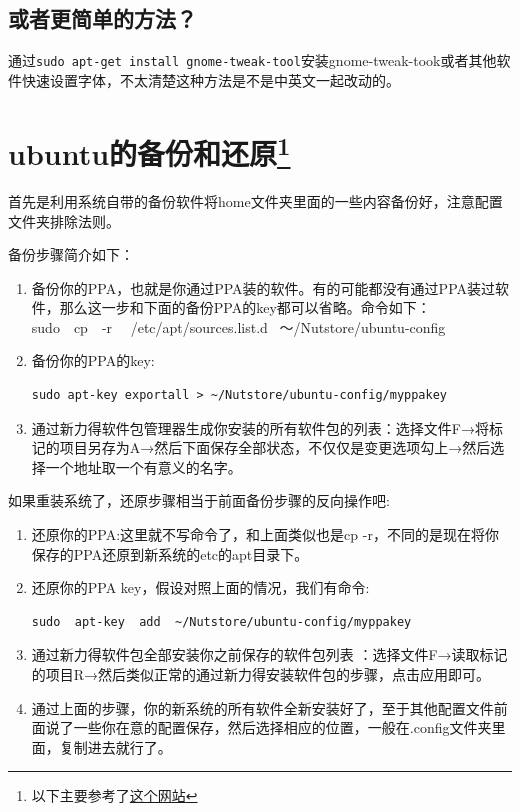 \documentclass[12pt,oneside]{book}
\begin{document}
\begin{common-format}
\subsection{或者更简单的方法？}
通过\verb+sudo apt-get install gnome-tweak-tool+安装gnome-tweak-took或者其他软件快速设置字体，不太清楚这种方法是不是中英文一起改动的。
 


\section[ubuntu的备份和还原]{ubuntu的备份和还原\footnote{以下主要参考了\href{http://www.matthartley.com/how-to-backup-your-ubuntu-software/}{这个网站}}}
首先是利用系统自带的备份软件将home文件夹里面的一些内容备份好，注意配置文件夹排除法则。

备份步骤简介如下：
\begin{enumerate}
\item 备份你的PPA，也就是你通过PPA装的软件。有的可能都没有通过PPA装过软件，那么这一步和下面的备份PPA的key都可以省略。命令如下：\\
sudo~~cp~~-r ~~/etc/apt/sources.list.d~ ～/Nutstore/ubuntu-config
\item 备份你的PPA的key:
\begin{Verbatim}
sudo apt-key exportall > ~/Nutstore/ubuntu-config/myppakey
\end{Verbatim}
\item 通过新力得软件包管理器生成你安装的所有软件包的列表：选择文件F→将标记的项目另存为A→然后下面保存全部状态，不仅仅是变更选项勾上→然后选择一个地址取一个有意义的名字。
\end{enumerate}

如果重装系统了，还原步骤相当于前面备份步骤的反向操作吧:
\begin{enumerate}
\item 还原你的PPA:这里就不写命令了，和上面类似也是cp   -r，不同的是现在将你保存的PPA还原到新系统的etc的apt目录下。
\item 还原你的PPA key，假设对照上面的情况，我们有命令:
\begin{Verbatim}
sudo  apt-key  add  ~/Nutstore/ubuntu-config/myppakey
\end{Verbatim}
\item 通过新力得软件包全部安装你之前保存的软件包列表 ：选择文件F→读取标记的项目R→然后类似正常的通过新力得安装软件包的步骤，点击应用即可。
\item 通过上面的步骤，你的新系统的所有软件全新安装好了，至于其他配置文件前面说了一些你在意的配置保存，然后选择相应的位置，一般在.config文件夹里面，复制进去就行了。
\end{enumerate}


\end{common-format}
\end{document}
